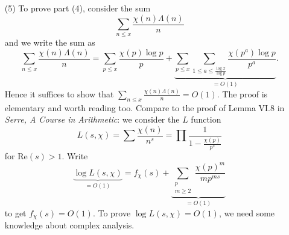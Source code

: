 \documentclass{article}
\begin{document}
\begin{enumerate}
\item[(5)]
  To prove part (4), consider the sum
  \[
    \sum_{n \leq x} \frac{\chi(n) \Lambda(n)}{n}
  \]
  and we write the sum as
  \[
    \sum_{n \leq x} \frac{\chi(n) \Lambda(n)}{n}
    = \sum_{p \leq x} \frac{\chi(p) \log p}{p}
        + \underbrace{\sum_{p \leq x} \sum_{1 \leq a \leq \frac{\log x}{\log p}}
            \frac{\chi(p^a) \log p}{p^a}}_{= O(1)}.
  \]
  Hence it suffices to show that $\sum_{n \leq x} \frac{\chi(n) \Lambda(n)}{n} = O(1)$.
  The proof is elementary and worth reading too.
  Compare to the proof of Lemma VI.8 in \emph{Serre, A Course in Arithmetic}:
  we consider the $L$ function
  \[
    L(s,\chi)
    = \sum \frac{\chi(n)}{n^s}
    = \prod \frac{1}{1 - \frac{\chi(p)}{p^s}}
  \]
  for $\mathrm{Re}(s) > 1$.
  Write
  \[
    \underbrace{\log L(s,\chi)}_{= O(1)}
    = f_{\chi}(s) + \underbrace{\sum_{\substack{p \\ m \geq 2}} \frac{\chi(p)^m}{mp^{ms}}}_{= O(1)}
  \]
  to get $f_{\chi}(s) = O(1)$.
  To prove $\log L(s,\chi) = O(1)$, we need some knowledge about complex analysis.
\end{enumerate}



\end{document}
